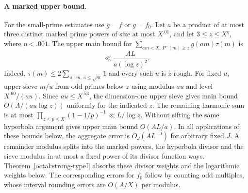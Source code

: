 \documentclass[11pt,a4paper]{article}
\theoremstyle{paperplain}
\numberwithin{equation}{section}
\begin{document}
\paragraph{A marked upper bound.}
For the small-prime estimates use $g=f$ or $g=f_0$. Let $a$ be a
product of at most three distinct marked prime powers of size at most
$X^{.01}$, and let $3\le z\le X^\eta$, where $\eta<.001$.
The upper main bound for
$\sum_{am<X,\,P^-(m)\ge z}g(am)\tau(m)$ is
\begin{equation}
 \ll \frac{AL}{a(\log z)^2}.
 \label{eq:vaughan-rough-hyperbola}
\end{equation}
Indeed, $\tau(m)\le2\sum_{u\mid m,\,u\le\sqrt m}1$ and every such
$u$ is $z$-rough. For fixed $u$, upper-sieve $m/u$ from odd primes below
$z$ using modulus $au$ and level $X^{.60}/(au)$. Since $au\le X^{.53}$,
the dimension-one upper sieve gives main bound $O(A/(au\log z))$
uniformly for the indicated $z$. The remaining harmonic sum is at most
$\prod_{z\le p\le X}(1-1/p)^{-1}\ll L/\log z$. Without sifting the
same hyperbola argument gives upper main bound $O(AL/a)$.
In all applications of these bounds below, the aggregate error is
$O_J(AL^{-J})$ for arbitrary fixed $J$. A remainder modulus splits into
the marked powers, the hyperbola divisor and the sieve modulus in at
most a fixed power of its divisor function ways. Theorem~\ref{octal:strong-typeI}
absorbs these divisor weights and the logarithmic weights below.
The corresponding errors for $f_0$ follow by counting odd multiples,
whose interval rounding errors are $O(A/X)$ per modulus.
\end{document}
